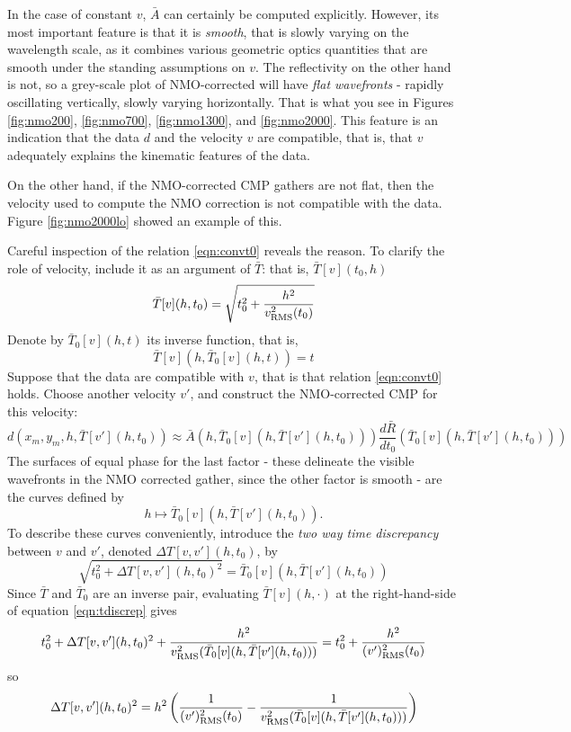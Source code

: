 In the case of constant $v$, $\bar{A}$ can certainly be computed explicitly. However, its most important feature is that it is {\em smooth}, that is slowly varying on the wavelength scale, as it combines various geometric optics quantities that are smooth under the standing assumptions on $v$.  The reflectivity on the other hand is not, so a grey-scale plot of NMO-corrected will have {\em flat wavefronts} - rapidly oscillating vertically, slowly varying horizontally. That is what you see in Figures \ref{fig:nmo200}, \ref{fig:nmo700}, \ref{fig:nmo1300}, and \ref{fig:nmo2000}. This feature is an indication that the data $d$ and the velocity $v$ are compatible, that is, that $v$ adequately explains the kinematic features of the data.

On the other hand, if the NMO-corrected CMP gathers are not flat, then the velocity used to compute the NMO correction is not compatible with the data. Figure \ref{fig:nmo2000lo} showed an example of this. 

Careful inspection of the relation \ref{eqn:convt0} reveals the reason. To clarify the role of velocity, include it as an argument of $\bar{T}$: that is, $\bar{T}[v](t_0,h)$ 
\begin{equation}
\label{eqn:hnmov}
\bar{T}[v](h,t_0) = \sqrt{t_0^2 + \frac{h^2}{v_{\rm RMS}^2(t_0)}} 
\end{equation}
Denote by $\bar{T}_0[v](h,t)$ its inverse function, that is, 
\[
\bar{T}[v](h,\bar{T}_0[v](h,t)) = t
\]
Suppose that the data are compatible with $v$, that is that relation \ref{eqn:convt0} holds. Choose another velocity $v'$, and construct the NMO-corrected CMP for this velocity: 
\begin{equation}
\label{eqn:convt0}
d(x_m,y_m,h,\bar{T}[v'](h,t_0)) \approx \bar{A}(h,\bar{T}_0[v](h,\bar{T}[v'](h,t_0))) \frac{d\bar{R}}{dt_0}(\bar{T}_0[v](h,\bar{T}[v'](h,t_0)))
\end{equation}
The surfaces of equal phase for the last factor - these delineate the visible wavefronts in the NMO corrected gather, since the other factor is smooth - are the curves defined by 
\[
h \mapsto \bar{T}_0[v](h,\bar{T}[v'](h,t_0)).
\]
To describe these curves conveniently, introduce the {\em two way time discrepancy} between $v$ and $v'$, denoted $\Delta T[v,v'](h,t_0)$, by
\begin{equation}
\label{eqn:tdiscrep}
\sqrt{t_0^2 + \Delta T[v,v'](h,t_0)^2} = \bar{T}_0[v](h,\bar{T}[v'](h,t_0))
\end{equation}
Since $\bar{T}$ and $\bar{T}_0$ are an inverse pair, evaluating $\bar{T}[v](h,\cdot)$ at the right-hand-side of equation \ref{eqn:tdiscrep} gives
\[
t_0^2 + \Delta T[v,v'](h,t_0)^2 +\frac{h^2}{v_{\rm RMS}^2(\bar{T}_0[v](h,\bar{T}[v'](h,t_0)))} = t_0^2 + \frac{h^2}{(v')_{\rm RMS}^2(t_0)}
\]
so 
\begin{equation}
\label{eqn:tdiscrep1}
\Delta T[v,v'](h,t_0)^2 =  h^2\left(\frac{1}{(v')_{\rm RMS}^2(t_0)}-\frac{1}{v_{\rm RMS}^2(\bar{T}_0[v](h,\bar{T}[v'](h,t_0)))} \right)
\end{equation}


